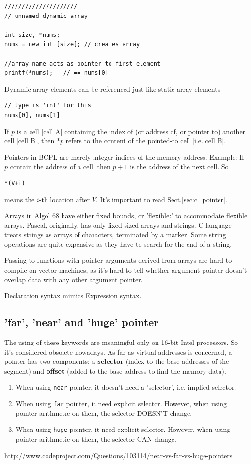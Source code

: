 \begin{verbatim}
/////////////////////
// unnamed dynamic array

int size, *nums;
nums = new int [size]; // creates array

//array name acts as pointer to first element
printf(*nums);   // == nums[0]
\end{verbatim}
 
Dynamic array elements can be referenced just like static array elements
\begin{verbatim}
// type is 'int' for this
nums[0], nums[1]

\end{verbatim} 


If $p$ is a cell [cell A] containing the index of (or address of, or pointer to)
another cell [cell B], then $*p$ refers to the content of the pointed-to cell
[i.e. cell B].

Pointers in BCPL are merely integer indices of the memory address. Example: If
$p$ contain the address of a cell, then $p+1$ is the address of the next cell.
So
\begin{verbatim}
*(V+i)
\end{verbatim}
means the $i$-th location after $V$. It's important to read
Sect.\ref{sec:c_pointer}.

Arrays in Algol 68 have either fixed bounds, or 'flexible:' to accommodate
flexible arrays. Pascal, originally, has only fixed-sized arrays and strings. 
C language treats strings as arrays of characters, terminated by a marker. Some
string operations are quite expensive as they have to search for the end of
a string. 

Passing to functions with pointer arguments derived from arrays are hard to
compile on vector machines, as it's hard to tell whether argument pointer
doesn't overlap data with any other argument pointer. 

Declaration syntax mimics Expression syntax.




\subsection{'far', 'near' and 'huge' pointer}

The using of these keywords are meaningful only on 16-bit Intel processors. So
it's considered obsolete nowadays. As far as virtual addresses is concerned, a
pointer has two components: a {\bf selector} (index to the base addresses of the
segment) and {\bf offset} (added to the base address to find the memory data).
\begin{enumerate}
  \item  When using \verb!near! pointer, it doesn't need a
'selector', i.e. implied selector. 
  \item When using \verb!far! pointer, it need explicit selector. However, when
  using pointer arithmetic on them, the selector DOESN'T change.
  \item When using \verb!huge! pointer, it need explicit selector. However, when
  using pointer arithmetic on them, the selector CAN change.
\end{enumerate}
\url{http://www.codeproject.com/Questions/103114/near-vs-far-vs-huge-pointers}

